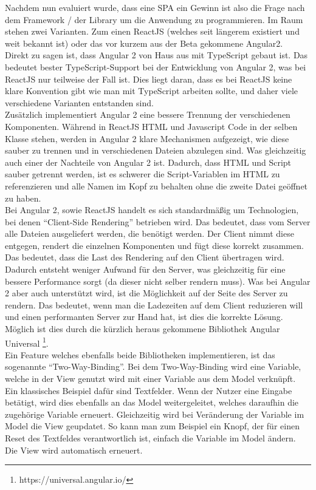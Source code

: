 Nachdem nun evaluiert wurde, dass eine SPA ein Gewinn ist also die Frage nach dem Framework / der Library um die Anwendung zu programmieren. Im Raum stehen zwei Varianten. Zum einen ReactJS (welches seit längerem existiert und weit bekannt ist) oder das vor kurzem aus der Beta gekommene Angular2. \\
Direkt zu sagen ist, dass Angular 2 von Haus aus mit TypeScript gebaut ist. Das bedeutet bester TypeScript-Support bei der Entwicklung von Angular 2, was bei ReactJS nur teilweise der Fall ist. Dies liegt daran, dass es bei ReactJS keine klare Konvention gibt wie man mit TypeScript arbeiten sollte, und daher viele verschiedene Varianten entstanden sind. \\
Zusätzlich implementiert Angular 2 eine bessere Trennung der verschiedenen Komponenten. Während in ReactJS HTML und Javascript Code in der selben Klasse stehen, werden in Angular 2 klare Mechanismen aufgezeigt, wie diese sauber zu trennen und in verschiedenen Dateien abzulegen sind. Was gleichzeitig auch einer der Nachteile von Angular 2 ist. Dadurch, dass HTML und Script sauber getrennt werden, ist es schwerer die Script-Variablen im HTML zu referenzieren und alle Namen im Kopf zu behalten ohne die zweite Datei geöffnet zu haben. \\

Bei Angular 2, sowie ReactJS handelt es sich standardmäßig um Technologien, bei denen ``Client-Side Rendering'' betrieben wird. Das bedeutet, dass vom Server alle Dateien ausgeliefert werden, die benötigt werden. Der Client nimmt diese entgegen, rendert die einzelnen Komponenten und fügt diese korrekt zusammen. Das bedeutet, dass die Last des Rendering auf den Client übertragen wird. Dadurch entsteht weniger Aufwand für den Server, was gleichzeitig für eine bessere Performance sorgt (da dieser nicht selber rendern muss). Was bei Angular 2 aber auch unterstützt wird, ist die Möglichkeit auf der Seite des Server zu rendern. Das bedeutet, wenn man  die Ladezeiten auf dem Client reduzieren will und einen performanten Server zur Hand hat, ist dies die korrekte Lösung. Möglich ist dies durch die kürzlich heraus gekommene Bibliothek Angular Universal  \footnote{https://universal.angular.io/}. \\

Ein Feature welches ebenfalls beide Bibliotheken implementieren, ist das sogenannte ``Two-Way-Binding''. Bei dem Two-Way-Binding wird eine Variable, welche in der View genutzt wird mit einer Variable aus dem Model verknüpft. Ein klassisches Beispiel dafür sind Textfelder. Wenn der Nutzer eine Eingabe betätigt, wird dies ebenfalls an das Model weitergeleitet, welches daraufhin die zugehörige Variable erneuert. Gleichzeitig wird bei Veränderung der Variable im Model die View geupdatet. So kann man zum Beispiel ein Knopf, der für einen Reset des Textfeldes verantwortlich ist, einfach die Variable im Model ändern. Die View wird automatisch erneuert. \\

